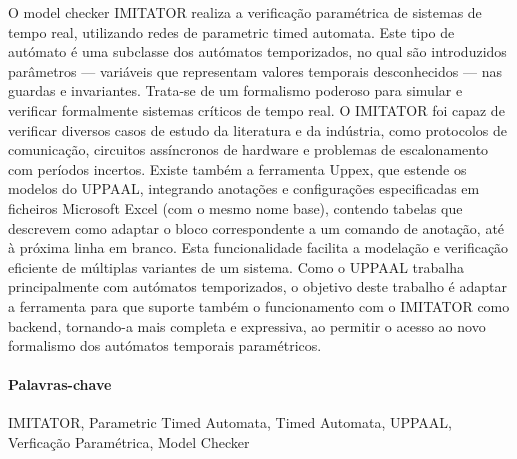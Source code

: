 O model checker IMITATOR realiza a verificação paramétrica de sistemas de tempo real, utilizando redes de parametric timed automata. Este tipo de autómato é uma subclasse dos autómatos temporizados, no qual são introduzidos parâmetros — variáveis que representam valores temporais desconhecidos — nas guardas e invariantes. Trata-se de um formalismo poderoso para simular e verificar formalmente sistemas críticos de tempo real. O IMITATOR foi capaz de verificar diversos casos de estudo da literatura e da indústria, como protocolos de comunicação, circuitos assíncronos de hardware e problemas de escalonamento com períodos incertos. Existe também a ferramenta Uppex, que estende os modelos do UPPAAL, integrando anotações e configurações especificadas em ficheiros Microsoft Excel (com o mesmo nome base), contendo tabelas que descrevem como adaptar o bloco correspondente a um comando de anotação, até à próxima linha em branco. Esta funcionalidade facilita a modelação e verificação eficiente de múltiplas variantes de um sistema. Como o UPPAAL trabalha principalmente com autómatos temporizados, o objetivo deste trabalho é adaptar a ferramenta para que suporte também o funcionamento com o IMITATOR como backend, tornando-a mais completa e expressiva, ao permitir o acesso ao novo formalismo dos autómatos temporais paramétricos.

\paragraph{Palavras-chave} IMITATOR, Parametric Timed Automata, Timed Automata, UPPAAL, Verficação Paramétrica, Model Checker 

\cleardoublepage
